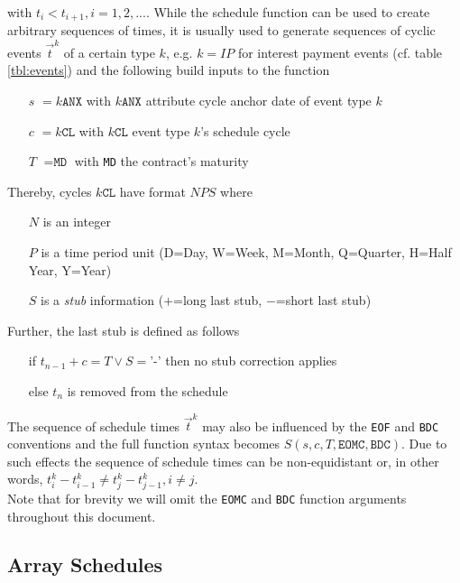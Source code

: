 \documentclass[9pt,oneside]{amsart}
\newcommand{\attr}[1]{\texttt{#1}}
\newcommand{\sdl}[3]{S(#1,#2,#3)}
\begin{document}
\begin{multicols}{2}
with $t_i<t_{i+1}, i=1,2,...$. While the schedule function can be used to create arbitrary sequences of times, it is usually used to generate sequences of cyclic events $\vec{t}^k$ of a certain type $k$, e.g. $k=IP$ for interest payment events (cf. table \ref{tbl:events}) and the following build inputs to the function

\begin{itemize}
	\item[$s$] $=k\attr{ANX}$ with $k\attr{ANX}$ attribute cycle anchor date of event type $k$
	
	\item[$c$] $=k\attr{CL}$ with $k\attr{CL}$ event type $k$'s schedule cycle
	
	\item[$T$] $=\attr{MD}$ with \attr{MD} the contract's maturity
\end{itemize}

Thereby, cycles $k\attr{CL}$ have format $NPS$ where 

\begin{itemize}
	\item[$N$] is an integer
	\item[$P$] is a time period unit (D=Day, W=Week, M=Month, Q=Quarter, H=Half Year, Y=Year)
	\item[$S$] is a \textit{stub} information ($+$=long last stub, $-$=short last stub)
\end{itemize}

Further, the last stub is defined as follows

\begin{itemize}
	\item[if] $t_{n-1}+c=T \lor S=$'-' then no stub correction applies

	\item[else] $t_n$ is removed from the schedule
\end{itemize}

The sequence of schedule times $\vec{t}^k$ may also be influenced by the \attr{EOF} and \attr{BDC} conventions and the full function syntax becomes $\sdl{s}{c}{T, \attr{EOMC}, \attr{BDC}}$. Due to such effects the sequence of schedule times can be non-equidistant or, in other words, $t_i^k-t_{i-1}^k\neq t_j^k-t_{j-1}^k, i\neq j$.\\

Note that for brevity we will omit the \attr{EOMC} and \attr{BDC} function arguments throughout this document.


\subsection{Array Schedules}


\end{multicols}
\end{document}
